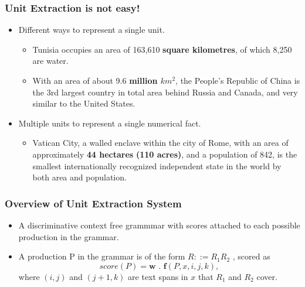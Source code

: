 \documentclass{beamer}
\begin{document}
\begin{frame}
{\begin{frame}
\begin{itemize}
 \end{itemize}

 
\end{frame}

\begin{frame}
 \frametitle{Unit Extraction is not easy!} \pause
 
 \begin{itemize}
    \item Different ways to represent a single unit. \pause
    
    \begin{itemize}
     \item Tunisia occupies an area of 163,610 \textbf{square kilometres}, of which 8,250 are water. \pause
     \item With an area of about 9.6 \textbf{million $km^{2}$}, the People's Republic of China is the 3rd largest country in total area behind Russia and Canada, and very similar to the United States.
    \end{itemize}
\pause
    
    \item Multiple units to represent a single numerical fact. \pause
    \begin{itemize}
      \item Vatican City, a walled enclave within the city of Rome, with an area of approximately \textbf{44 hectares} \textbf{(110 acres)}, and a population of 842, is the smallest internationally recognized independent state in the world by both area and population.
    \end{itemize}
 \end{itemize}
\end{frame}


\begin{frame}
 \frametitle{Overview of Unit Extraction System} \pause
 
 \begin{itemize}
  
  \item A discriminative context free grammmar with scores
attached to each possible production in the grammar. \pause
  \item A production P in the grammar is of the form  $ R ::= R_{1} R_{2}$ , scored as 
\begin{equation*}
	score(P) = \textbf{w . f}(P, x, i, j, k), 
\end{equation*}
where $(i,j)$ and $(j+1,k)$ are text spans in $x$ that $R_{1}$ and $R_{2}$
cover.
 \end{itemize}
\end{frame}

}
\end{frame}
\end{document}
